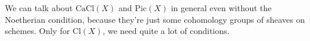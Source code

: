 \documentclass[../main.tex]{subfiles}
\begin{document}
\begin{example}

\end{example}
\begin{remark}
We can talk about $\mathrm{CaCl}(X)$ and $\mathrm{Pic}(X)$ in general even without the Noetherian condition, because they're just some cohomology groups of sheaves on schemes. Only for $\mathrm{Cl}(X)$, we need quite a lot of conditions.
\end{remark}

\begin{example}

\end{example}

\begin{example}

\end{example}
\end{document}
